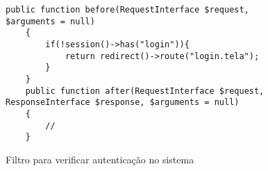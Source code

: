 \begin{figure}[hb!]
    \centering
    \begin{lstlisting}[style=phplisting]
  public function before(RequestInterface $request, $arguments = null)
    {
        if(!session()->has("login")){
            return redirect()->route("login.tela");
        }
    }
    public function after(RequestInterface $request, ResponseInterface $response, $arguments = null)
    {
        //
    }
    \end{lstlisting}
    \caption{Filtro para verificar autenticação no sistema}
    \label{cod:AuthFilter}
\end{figure}